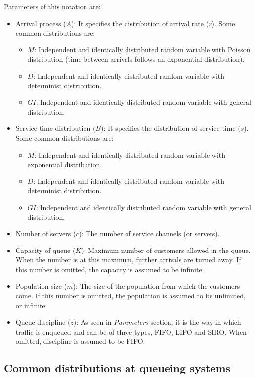 \documentclass[../main.tex]{subfiles}
\begin{document}
Parameters of this notation are:

\begin{itemize}
	\item {
		Arrival process ($A$): It specifies the distribution of arrival rate ($r$). Some common distributions are:
		\begin{itemize}
			\item $M$: Independent and identically distributed random variable with Poisson distribution (time between arrivals follows an exponential distribution).
			\item $D$: Independent and identically distributed random variable with determinist distribution.
			\item $GI$: Independent and identically distributed random variable with general distribution.
		\end{itemize}
	}
	\item {
		Service time distribution ($B$): It specifies the distribution of service time ($s$). Some common distributions are:
		\begin{itemize}
			\item $M$: Independent and identically distributed random variable with exponential distribution.
			\item $D$: Independent and identically distributed random variable with determinist distribution.
			\item $GI$: Independent and identically distributed random variable with general distribution.
		\end{itemize}
	}
	\item Number of servers ($c$): The number of service channels (or servers).
	\item Capacity of queue ($K$): Maximum number of customers allowed in the queue. When the number is at this maximum, further arrivals are turned away. If this number is omitted, the capacity is assumed to be infinite.
	\item Population size ($m$): The size of the population from which the customers come. If this number is omitted, the population is assumed to be unlimited, or infinite.
	\item Queue discipline ($z$): As seen in \textit{Parameters} section, it is the way in which traffic is enqueued and can be of three types, FIFO, LIFO and SIRO. When omitted, discipline is assumed to be FIFO.
\end{itemize}

\subsection{Common distributions at queueing systems}
\end{document}
